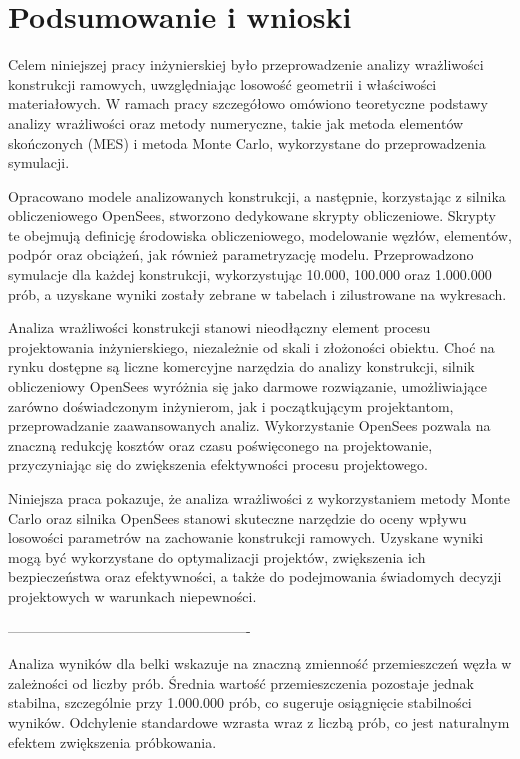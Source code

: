 \section{Podsumowanie i wnioski}

Celem niniejszej pracy inżynierskiej było przeprowadzenie analizy wrażliwości konstrukcji ramowych, uwzględniając losowość geometrii i właściwości materiałowych.
W ramach pracy szczegółowo omówiono teoretyczne podstawy analizy wrażliwości oraz metody numeryczne, takie jak metoda elementów skończonych (MES) i metoda Monte Carlo, wykorzystane do przeprowadzenia symulacji.

Opracowano modele analizowanych konstrukcji, a następnie, korzystając z silnika obliczeniowego OpenSees, stworzono dedykowane skrypty obliczeniowe.
Skrypty te obejmują definicję środowiska obliczeniowego, modelowanie węzłów, elementów, podpór oraz obciążeń, jak również parametryzację modelu.
Przeprowadzono symulacje dla każdej konstrukcji, wykorzystując 10.000, 100.000 oraz 1.000.000 prób, a uzyskane wyniki zostały zebrane w tabelach i zilustrowane na wykresach.

Analiza wrażliwości konstrukcji stanowi nieodłączny element procesu projektowania inżynierskiego, niezależnie od skali i złożoności obiektu.
Choć na rynku dostępne są liczne komercyjne narzędzia do analizy konstrukcji, silnik obliczeniowy OpenSees wyróżnia się jako darmowe rozwiązanie, umożliwiające zarówno doświadczonym inżynierom, jak i początkującym projektantom, przeprowadzanie zaawansowanych analiz.
Wykorzystanie OpenSees pozwala na znaczną redukcję kosztów oraz czasu poświęconego na projektowanie, przyczyniając się do zwiększenia efektywności procesu projektowego.

Niniejsza praca pokazuje, że analiza wrażliwości z wykorzystaniem metody Monte Carlo oraz silnika OpenSees stanowi skuteczne narzędzie do oceny wpływu losowości parametrów na zachowanie konstrukcji ramowych.
Uzyskane wyniki mogą być wykorzystane do optymalizacji projektów, zwiększenia ich bezpieczeństwa oraz efektywności, a także do podejmowania świadomych decyzji projektowych w warunkach niepewności.

----------------------------------------------------

Analiza wyników dla belki wskazuje na znaczną zmienność przemieszczeń węzła w zależności od liczby prób.
Średnia wartość przemieszczenia pozostaje jednak stabilna, szczególnie przy 1.000.000 prób, co sugeruje osiągnięcie stabilności wyników.
Odchylenie standardowe wzrasta wraz z liczbą prób, co jest naturalnym efektem zwiększenia próbkowania.

